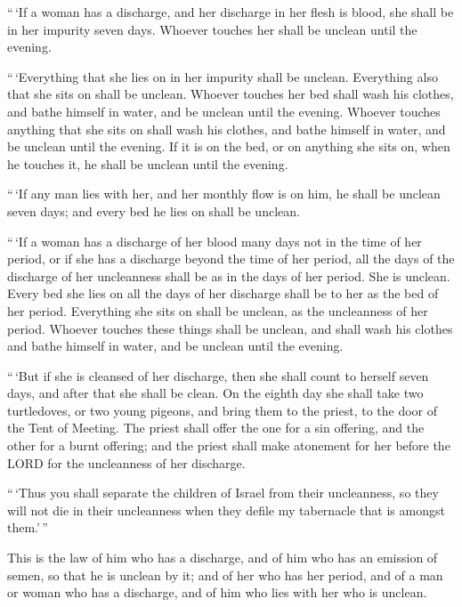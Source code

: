  ``\,`If a woman has a discharge, and her discharge in her
flesh is blood, she shall be in her impurity seven days. Whoever touches
her shall be unclean until the evening.

 ``\,`Everything that she lies on in her impurity shall be
unclean. Everything also that she sits on shall be unclean.
 Whoever touches her bed shall wash his clothes, and bathe
himself in water, and be unclean until the evening. 
Whoever touches anything that she sits on shall wash his clothes, and
bathe himself in water, and be unclean until the evening. 
If it is on the bed, or on anything she sits on, when he touches it, he
shall be unclean until the evening.

 ``\,`If any man lies with her, and her monthly flow is on
him, he shall be unclean seven days; and every bed he lies on shall be
unclean.

 ``\,`If a woman has a discharge of her blood many days not
in the time of her period, or if she has a discharge beyond the time of
her period, all the days of the discharge of her uncleanness shall be as
in the days of her period. She is unclean.  Every bed she
lies on all the days of her discharge shall be to her as the bed of her
period. Everything she sits on shall be unclean, as the uncleanness of
her period.  Whoever touches these things shall be unclean,
and shall wash his clothes and bathe himself in water, and be unclean
until the evening.

 ``\,`But if she is cleansed of her discharge, then she
shall count to herself seven days, and after that she shall be clean.
 On the eighth day she shall take two turtledoves, or two
young pigeons, and bring them to the priest, to the door of the Tent of
Meeting.  The priest shall offer the one for a sin
offering, and the other for a burnt offering; and the priest shall make
atonement for her before the LORD for the uncleanness of her discharge.

 ``\,`Thus you shall separate the children of Israel from
their uncleanness, so they will not die in their uncleanness when they
defile my tabernacle that is amongst them.'\,''

 This is the law of him who has a discharge, and of him who
has an emission of semen, so that he is unclean by it;  and
of her who has her period, and of a man or woman who has a discharge,
and of him who lies with her who is unclean.


